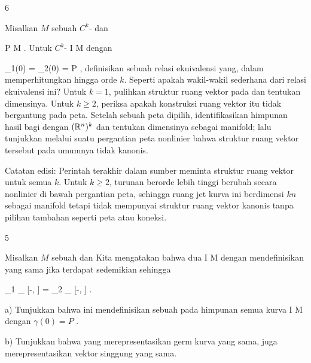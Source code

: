 {6}
{

Misalkan $M$ sebuah
$C^k$-
dan

\mavergleichskette
{\vergleichskette
{ P
}
{ \in }{ M
}
{  }{
}
{    }{
}
{   }{
}
}
{}{}{.}
Untuk
$C^k$-
 { I } { M
} {}
dengan

\mavergleichskette
{\vergleichskette
{ \gamma_1(0)
}
{ = }{ \gamma_2(0)
}
{ = }{ P
}
{    }{
}
{   }{
}
}
{}{}{}, definisikan sebuah relasi ekuivalensi yang, dalam
 {} {}
memperhitungkan
hingga orde $k$. Seperti apakah wakil-wakil sederhana dari relasi ekuivalensi ini? Untuk $k=1$, pulihkan struktur ruang vektor pada
dan tentukan dimensinya. Untuk $k\geq 2$, periksa apakah konstruksi ruang vektor itu tidak bergantung pada peta. Setelah sebuah peta dipilih, identifikasikan himpunan hasil bagi dengan $({\mathbb R}^n)^k$ dan tentukan dimensinya sebagai manifold; lalu tunjukkan melalui suatu pergantian peta nonlinier bahwa struktur ruang vektor tersebut pada umumnya tidak kanonis.

Catatan edisi: Perintah terakhir dalam sumber meminta struktur ruang vektor untuk semua $k$. Untuk $k\geq2$, turunan berorde lebih tinggi berubah secara nonlinier di bawah pergantian peta, sehingga ruang jet kurva ini berdimensi $kn$ sebagai manifold tetapi tidak mempunyai struktur ruang vektor kanonis tanpa pilihan tambahan seperti peta atau koneksi.

}
{} {}

{5}
{

Misalkan $M$ sebuah
dan
 Kita mengatakan bahwa dua
 { I } { M
} {}
dengan
 mendefinisikan  {} yang sama jika terdapat
 sedemikian sehingga

\mavergleichskettedisp
{\vergleichskette
{ \gamma_1 \!\mid_{ [-\epsilon, \epsilon]}
}
{ =} { \gamma_2 \!\mid_{ [-\epsilon, \epsilon]}
}
{ } {
}
{ } {
}
{ } {
}
}
{}{}{.}

a) Tunjukkan bahwa ini mendefinisikan sebuah
pada himpunan semua kurva
\maabb {\gamma} { I } { M
} {}
dengan $\gamma(0)= P$
 {} {.}

b) Tunjukkan bahwa
yang merepresentasikan germ kurva yang sama, juga merepresentasikan vektor singgung yang sama.

}
{} {}

